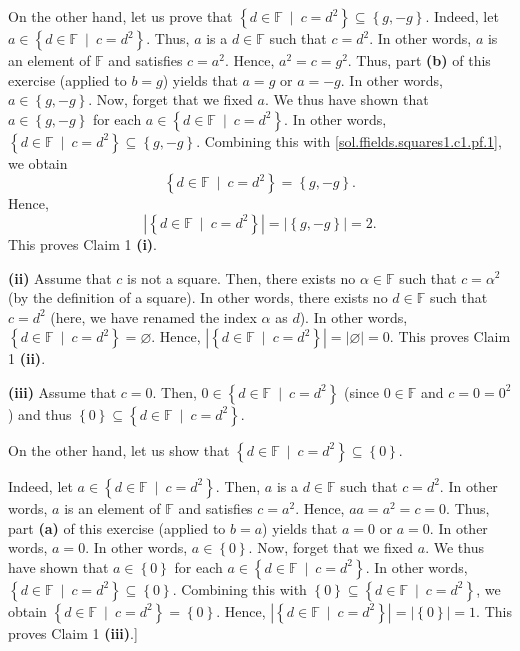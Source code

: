 \documentclass[paper=a4, fontsize=12pt]{scrartcl}%
\theoremstyle{plainsl}
\theoremstyle{definition}
\theoremstyle{remark}
\begin{document}
On the other hand, let us prove that $\left\{  d\in\mathbb{F}\ \mid
\ c=d^{2}\right\}  \subseteq\left\{  g,-g\right\}  $. Indeed, let
$a\in\left\{  d\in\mathbb{F}\ \mid\ c=d^{2}\right\}  $. Thus, $a$ is a
$d\in\mathbb{F}$ such that $c=d^{2}$. In other words, $a$ is an element of
$\mathbb{F}$ and satisfies $c=a^{2}$. Hence, $a^{2}=c=g^{2}$. Thus, part
\textbf{(b)} of this exercise (applied to $b=g$) yields that $a=g$ or $a=-g$.
In other words, $a\in\left\{  g,-g\right\}  $. Now, forget that we fixed $a$.
We thus have shown that $a\in\left\{  g,-g\right\}  $ for each $a\in\left\{
d\in\mathbb{F}\ \mid\ c=d^{2}\right\}  $. In other words, $\left\{
d\in\mathbb{F}\ \mid\ c=d^{2}\right\}  \subseteq\left\{  g,-g\right\}  $.
Combining this with \eqref{sol.ffields.squares1.c1.pf.1}, we obtain%
\[
\left\{  d\in\mathbb{F}\ \mid\ c=d^{2}\right\}  =\left\{  g,-g\right\}  .
\]
Hence,%
\[
\left\vert \left\{  d\in\mathbb{F}\ \mid\ c=d^{2}\right\}  \right\vert
=\left\vert \left\{  g,-g\right\}  \right\vert =2.
\]
This proves Claim 1 \textbf{(i)}.

\textbf{(ii)} Assume that $c$ is not a square. Then, there exists no
$\alpha\in\mathbb{F}$ such that $c=\alpha^{2}$ (by the definition of a
square). In other words, there exists no $d\in\mathbb{F}$ such that $c=d^{2}$
(here, we have renamed the index $\alpha$ as $d$). In other words, $\left\{
d\in\mathbb{F}\ \mid\ c=d^{2}\right\}  =\varnothing$. Hence, $\left\vert
\left\{  d\in\mathbb{F}\ \mid\ c=d^{2}\right\}  \right\vert =\left\vert
\varnothing\right\vert =0$. This proves Claim 1 \textbf{(ii)}.

\textbf{(iii)} Assume that $c=0$. Then, $0\in\left\{  d\in\mathbb{F}%
\ \mid\ c=d^{2}\right\}  $ (since $0\in\mathbb{F}$ and $c=0=0^{2}$) and thus
$\left\{  0\right\}  \subseteq\left\{  d\in\mathbb{F}\ \mid\ c=d^{2}\right\}
$.

On the other hand, let us show that $\left\{  d\in\mathbb{F}\ \mid
\ c=d^{2}\right\}  \subseteq\left\{  0\right\}  $.

Indeed, let $a\in\left\{  d\in\mathbb{F}\ \mid\ c=d^{2}\right\}  $. Then, $a$
is a $d\in\mathbb{F}$ such that $c=d^{2}$. In other words, $a$ is an element
of $\mathbb{F}$ and satisfies $c=a^{2}$. Hence, $aa=a^{2}=c=0$. Thus, part
\textbf{(a)} of this exercise (applied to $b=a$) yields that $a=0$ or $a=0$.
In other words, $a=0$. In other words, $a\in\left\{  0\right\}  $. Now, forget
that we fixed $a$. We thus have shown that $a\in\left\{  0\right\}  $ for each
$a\in\left\{  d\in\mathbb{F}\ \mid\ c=d^{2}\right\}  $. In other words,
$\left\{  d\in\mathbb{F}\ \mid\ c=d^{2}\right\}  \subseteq\left\{  0\right\}
$. Combining this with $\left\{  0\right\}  \subseteq\left\{  d\in
\mathbb{F}\ \mid\ c=d^{2}\right\}  $, we obtain $\left\{  d\in\mathbb{F}%
\ \mid\ c=d^{2}\right\}  =\left\{  0\right\}  $. Hence, $\left\vert \left\{
d\in\mathbb{F}\ \mid\ c=d^{2}\right\}  \right\vert =\left\vert \left\{
0\right\}  \right\vert =1$. This proves Claim 1 \textbf{(iii)}.]
\end{document}
